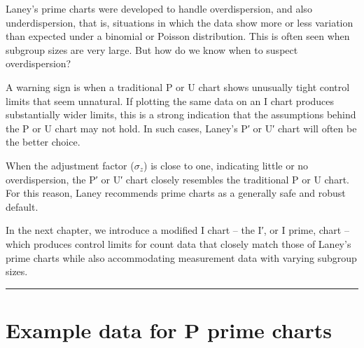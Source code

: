 \documentclass[
]{book}
\begin{document}
Laney's prime charts were developed to handle overdispersion, and also
underdispersion, that is, situations in which the data show more or less
variation than expected under a binomial or Poisson distribution. This
is often seen when subgroup sizes are very large. But how do we know
when to suspect overdispersion?

A warning sign is when a traditional P or U chart shows unusually tight
control limits that seem unnatural. If plotting the same data on an I
chart produces substantially wider limits, this is a strong indication
that the assumptions behind the P or U chart may not hold. In such
cases, Laney's P′ or U′ chart will often be the better choice.

When the adjustment factor (\(\sigma_z\)) is close to one, indicating
little or no overdispersion, the P′ or U′ chart closely resembles the
traditional P or U chart. For this reason, Laney recommends prime charts
as a generally safe and robust default.

In the next chapter, we introduce a modified I chart -- the I′, or I
prime, chart -- which produces control limits for count data that
closely match those of Laney's prime charts while also accommodating
measurement data with varying subgroup sizes.

\begin{center}\rule{0.5\linewidth}{0.5pt}\end{center}

\section*{Example data for P prime charts}\label{pp-data}
\end{document}

